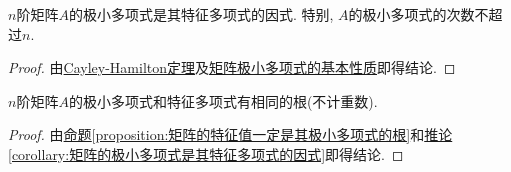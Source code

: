 \documentclass[../../main.tex]{subfiles}
\begin{document}
\begin{corollary}\label{corollary:矩阵的极小多项式是其特征多项式的因式}
$n$阶矩阵$A$的极小多项式是其特征多项式的因式. 特别, $A$的极小多项式的次数不超过$n$.
\end{corollary}
\begin{proof}
由\hyperref[theorem:Cayley-Hamilton定理]{Cayley-Hamilton定理}及\hyperref[lemma:矩阵极小多项式的基本性质]{矩阵极小多项式的基本性质}即得结论.
\end{proof}

\begin{corollary}
$n$阶矩阵$A$的极小多项式和特征多项式有相同的根(不计重数).
\end{corollary}
\begin{proof}
由\hyperref[proposition:矩阵的特征值一定是其极小多项式的根]{命题\ref{proposition:矩阵的特征值一定是其极小多项式的根}}和\hyperref[corollary:矩阵的极小多项式是其特征多项式的因式]{推论\ref{corollary:矩阵的极小多项式是其特征多项式的因式}}即得结论.
\end{proof}
\end{document}
